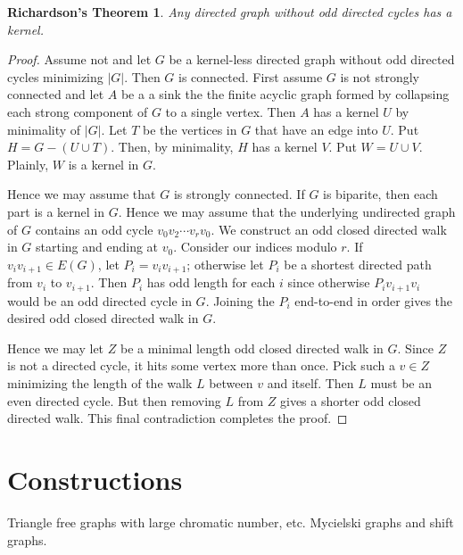 \documentclass[12pt]{article}
\theoremstyle{plain}
\newtheorem*{Richardson}{Richardson's Theorem}
\theoremstyle{definition}
\theoremstyle{remark}
\newcommand{\card}[1]{\left|#1\right|}
\begin{document}
\begin{Richardson}
Any directed graph without odd directed cycles has a kernel.
\end{Richardson}
\begin{proof}
Assume not and let $G$ be a kernel-less directed graph without odd directed cycles minimizing $\card{G}$.  Then $G$ is connected.  First assume $G$ is not strongly connected and let $A$ be a a sink the the finite acyclic graph formed by collapsing each strong component of $G$ to a single vertex.  Then $A$ has a kernel $U$ by minimality of $\card{G}$.  Let $T$ be the vertices in $G$ that have an edge into $U$.  Put $H = G - (U \cup T)$.  Then, by minimality, $H$ has a kernel $V$.  Put $W = U \cup V$.  Plainly, $W$ is a kernel in $G$.

Hence we may assume that $G$ is strongly connected.  If $G$ is biparite, then each part is a kernel in $G$.  Hence we may assume that the underlying undirected graph of $G$ contains an odd cycle $v_0v_2\cdots v_rv_0$.  We construct an odd closed directed walk in $G$ starting and ending at $v_0$. Consider our indices modulo $r$. If $v_iv_{i+1} \in E(G)$, let $P_i = v_iv_{i+1}$; otherwise let $P_i$ be a shortest directed path from $v_i$ to $v_{i+1}$.  Then $P_i$ has odd length for each $i$ since otherwise $P_iv_{i+1}v_i$ would be an odd directed cycle in $G$.  Joining the $P_i$ end-to-end in order gives the desired odd closed directed walk in $G$.

Hence we may let $Z$ be a minimal length odd closed directed walk in $G$.  Since $Z$ is not a directed cycle, it hits some vertex more than once.  Pick such a $v \in Z$ minimizing the length of the walk $L$ between $v$ and itself.  Then $L$ must be an even directed cycle.  But then removing $L$ from $Z$ gives a shorter odd closed directed walk. This final contradiction completes the proof.
\end{proof}

\section{Constructions}
Triangle free graphs with large chromatic number, etc. Mycielski graphs and shift graphs.
\end{document}
